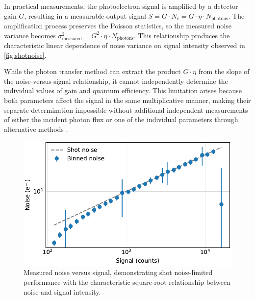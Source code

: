 \documentclass[
	parskip=half,
	a4paper,
]{scrarticle}
\begin{document}
In practical measurements, the photoelectron signal is amplified by a detector gain $G$, resulting in a measurable output signal $S = G \cdot N_e = G \cdot \eta \cdot N_{\text{photons}}$. The amplification process preserves the Poisson statistics, so the measured noise variance becomes $\sigma^2_{\text{measured}} = G^2 \cdot \eta \cdot N_{\text{photons}}$. This relationship produces the characteristic linear dependence of noise variance on signal intensity observed in \autoref{fig:shotnoise}.

While the photon transfer method can extract the product $G \cdot \eta$ from the slope of the noise-versus-signal relationship, it cannot independently determine the individual values of gain and quantum efficiency. This limitation arises because both parameters affect the signal in the same multiplicative manner, making their separate determination impossible without additional independent measurements of either the incident photon flux or one of the individual parameters through alternative methods \cite{european_machine_vision_association_standard_2010}.

\begin{figure}
    \centering
    \includegraphics{../analysis/figures/shot noise.pdf}
    \caption{Measured noise versus signal, demonstrating shot noise-limited performance with the characteristic square-root relationship between noise and signal intensity.}
    \label{fig:shotnoise}
\end{figure}


\end{document}
